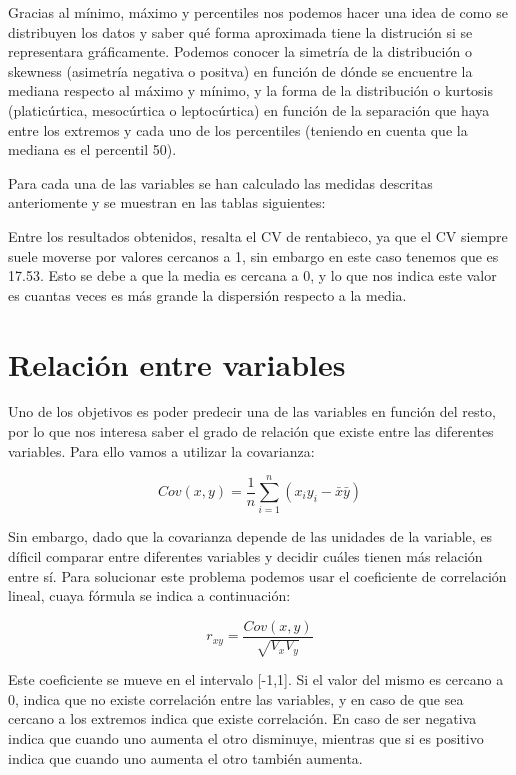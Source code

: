 \documentclass{article}
\begin{document}
Gracias al mínimo, máximo y percentiles nos podemos hacer una idea de como se distribuyen los datos y saber qué forma aproximada tiene la distrución si se representara gráficamente. Podemos conocer la simetría de la distribución o skewness (asimetría negativa o positva) en función de dónde se encuentre la mediana respecto al máximo y mínimo, y la forma de la distribución o kurtosis (platicúrtica, mesocúrtica o leptocúrtica) en función de la separación que haya entre los extremos y cada uno de los percentiles (teniendo en cuenta que la mediana es el percentil 50).

Para cada una de las variables se han calculado las medidas descritas anteriomente y se muestran en las tablas siguientes:



\FloatBarrier

Entre los resultados obtenidos, resalta el CV de rentabieco, ya que el CV siempre suele moverse por valores cercanos a 1, sin embargo en este caso tenemos que es 17.53. Esto se debe a que la media es cercana a 0, y lo que nos indica este valor es cuantas veces es más grande la dispersión respecto a la media.

\section{Relación entre variables}

Uno de los objetivos es poder predecir una de las variables en función del resto, por lo que nos interesa saber el grado de relación que existe entre las diferentes variables. Para ello vamos a utilizar la covarianza:

\[Cov(x,y)=\frac{1}{n}\sum_{i=1}^{n}(x_{i}y_{i}-\bar{x}\bar{y})\]

Sin embargo, dado que la covarianza depende de las unidades de la variable, es díficil comparar entre diferentes variables y decidir cuáles tienen más relación entre sí. Para solucionar este problema podemos usar el coeficiente de correlación lineal, cuaya fórmula se indica a continuación:

\[r_{xy}=\frac{Cov(x,y)}{\sqrt{V_{x}V_{y}}}\]

Este coeficiente se mueve en el intervalo [-1,1]. Si el valor del mismo es cercano a 0, indica que no existe correlación entre las variables, y en caso de que sea cercano a los extremos indica que existe correlación. En caso de ser negativa indica que cuando uno aumenta el otro disminuye, mientras que si es positivo indica que cuando uno aumenta el otro también aumenta.
\end{document}
